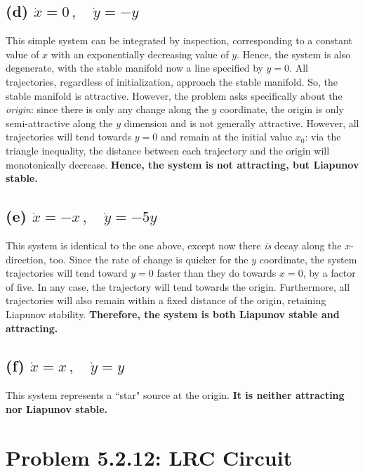 \documentclass[draft]{agujournal2019}
\begin{document}
\subsection{(d) $\dot x = 0 \,,\quad \dot y = -y $}
\label{ssec:p2d}

This simple system can be integrated by inspection, corresponding to a constant value of $x$ with an exponentially decreasing value of $y$. Hence, the system is also degenerate, with the stable manifold now a line specified by $y=0$. All trajectories, regardless of initialization, approach the stable manifold. So, the stable manifold is attractive. However, the problem asks specifically about the \emph{origin}: since there is only any change along the $y$ coordinate, the origin is only semi-attractive along the $y$ dimension and is not generally attractive. However, all trajectories will tend towards $y=0$ and remain at the initial value $x_0$: via the triangle inequality, the distance between each trajectory and the origin will monotonically decrease. \textbf{Hence, the system is not attracting, but Liapunov stable.}

\subsection{(e) $\dot x = -x \,,\quad \dot y = -5y $}
\label{ssec:p2e}

This system is identical to the one above, except now there \emph{is} decay along the $x$-direction, too. Since the rate of change is quicker for the $y$ coordinate, the system trajectories will tend toward $y=0$ faster than they do towards $x=0$, by a factor of five. In any case, the trajectory will tend towards the origin. Furthermore, all trajectories will also remain within a fixed distance of the origin, retaining Liapunov stability. \textbf{Therefore, the system is both Liapunov stable and attracting.} 


\subsection{(f) $\dot x = x \,,\quad \dot y = y $}
\label{ssec:p2f}

This system represents a ``star" source at the origin. \textbf{It is neither attracting nor Liapunov stable.}




\section{Problem 5.2.12: LRC Circuit }
\label{sec:p3}
\end{document}
